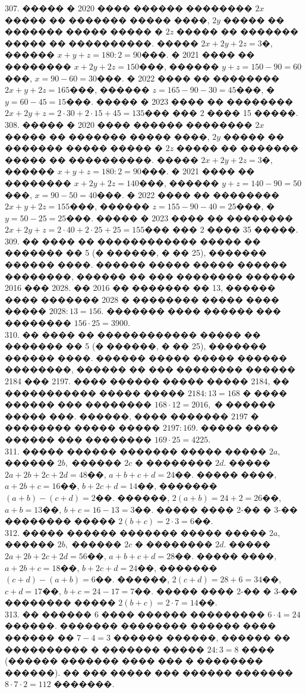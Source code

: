 \documentclass[12pt]{article}
\begin{document}
307. ����� � 2020 ���� ������ �������� $2x$ ����� �� ������� ����� ����, $2y$ ����� �� ������� ����� ����� � $2z$ ����� �� ������� ����� �� ����������. �����
$2x+2y+2z=3$�, ������ $x+y+z=180:2=90$���. � 2021 ���� �� �������� $x+2y+2z=150$���, ������ $y+z=150-90=60$���, $x=90-60=30$���. � 2022 ���� �� �������� $2x+y+2z=165$���, ������ $z=165-90-30=45$���, � $y=60-45=15$���. ����� � 2023 ���� �� �������� $2x+2y+z=2\cdot30+2\cdot15+45=135$��� ��� 2 ���� 15 �����.\\
308. ����� � 2020 ���� ������ �������� $2x$ ����� �� ������� ����� ����, $2y$ ����� �� ������� ����� ����� � $2z$ ����� �� ������� ����� �� ����������. �����
$2x+2y+2z=3$�, ������ $x+y+z=180:2=90$���. � 2021 ���� �� �������� $x+2y+2z=140$���, ������ $y+z=140-90=50$���, $x=90-50=40$���. � 2022 ���� �� �������� $2x+y+2z=155$���, ������ $z=155-90-40=25$���, � $y=50-25=25$���. ����� � 2023 ���� �� �������� $2x+2y+z=2\cdot40+2\cdot25+25=155$��� ��� 2 ���� 35 �����.\\
309. �� ���� �� ������������ ����� �� ������� �� 5 (� ������, � �� 25), ������� ������ ����. ������ ����� ����� ������ ��������, ������ �� ��� �������� ������ 2016 ��� 2028. �� 2016 �� ������� �� 13, ������ ���� ������� 2028 � �������� ����� ���� ����� $2028:13=156.$ ������� ���� ������ ��� �������� $156\cdot25=3900.$\\
310. �� ���� �� ������������ ����� �� ������� �� 5 (� ������, � �� 25), ������� ������ ����. ������ ����� ����� ������ ��������, ������ �� ��� �������� ������ 2184 ��� 2197. ���� ������ ����� ����� 2184, �� ����������� ����� ����� $2184:13=168$ � ���� ������ ��� �������� $168\cdot12=2016,$ � ������ ����� ���. ������, ���� ������� $2197$ � �������� ����� ����� $2197:169.$ ����� ���� ������ ��� �������� $169\cdot25=4225.$\\
311. ����� ������ ������� ����� ����� $2a,$ ������ $2b,$ ������ $2c$ � �������� $2d.$ ����� $2a+2b+2c+2d=48$��, $a+b+c+d=24$��. ����� ����, $a+2b+c=16$��, $b+2c+d=14$��, ������� $(a+b)-(c+d)=2$��. ������, $2(a+b)=24+2=26$��, $a+b=13$��, $b+c=16-13=3$��. ����� ���� 2-�� � 3-�� �������� ����� $2(b+c)=2\cdot3=6$��.\\
312. ����� ������ ������� ����� ����� $2a,$ ������ $2b,$ ������ $2c$ � �������� $2d.$ ����� $2a+2b+2c+2d=56$��, $a+b+c+d=28$��. ����� ����, $a+2b+c=18$��, $b+2c+d=24$��, ������� $(c+d)-(a+b)=6$��. ������, $2(c+d)=28+6=34$��, $c+d=17$��, $b+c=24-17=7$��. ����� ���� 2-�� � 3-�� �������� ����� $2(b+c)=2\cdot7=14$��.\\
313. �� ������ 6 ���� ������ ��������� $6\cdot4=24$ ������. ������� �������� ������ ���� ������ �� $7-4=3$ ������ ������, ������ �� ���������� � ������� ����� $24:3=8$ ���� (������ ������� ���� ��� � �������� ������). �� ��� ����� ��� ������ ������� $8\cdot7\cdot2=112$ �������.\\
\end{document}

